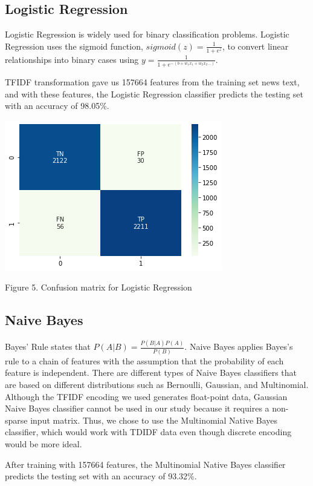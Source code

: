 \documentclass{article}
\begin{document}
\begin{multicols}{2}
\subsection{Logistic Regression}
Logistic Regression is widely used for binary classification problems. Logistic Regression uses the sigmoid function, $sigmoid(z)=  \frac{1}{1+e^{z}}$, to convert linear relationships into binary cases using $y=\frac{1}{1+e^{-(b+w_1x_1+w_2x_2...)}}$. 

TFIDF transformation gave us 157664 features from the training set news text, and with these features, the Logistic Regression classifier predicts the testing set with an accuracy of 98.05\%.
\begin{center}
\includegraphics[scale=0.45]{images/lrcm.png}
\newline
\caption{Figure 5. Confusion matrix for Logistic Regression}
\end{center}
\subsection{Naive Bayes}
Bayes' Rule states that $P(A|B)=\frac{P(B|A)P(A)}{P(B)}$. Naive Bayes applies Bayes's rule to a chain of features with the assumption that the probability of each feature is independent. There are different types of Naive Bayes classifiers that are based on different distributions such as Bernoulli, Gaussian, and Multinomial. Although the TFIDF encoding we used generates float-point data, Gaussian Naive Bayes classifier cannot be used in our study because it requires a non-sparse input matrix. Thus, we chose to use the Multinomial Native Bayes classifier, which would work with TDIDF data even though discrete encoding would be more ideal. 

After training with 157664 features, the Multinomial Native Bayes classifier predicts the testing set with an accuracy of 93.32\%.


\end{multicols}
\end{document}
